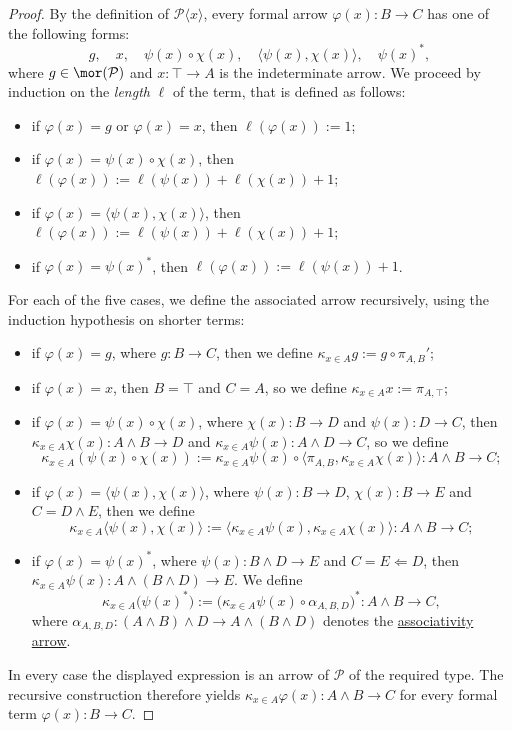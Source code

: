 \begin{proof}
    By the definition of $\mathcal P\langle x\rangle$, every formal arrow $\varphi(x) : B \to C$ has one of the following forms:
    \[ g,\quad x,\quad \psi(x) \circ \chi(x),\quad \langle \psi(x),\chi(x)\rangle,\quad \psi(x)^*, \]
    where $g \in \mor(\mathcal P)$ and $x : \top \to A$ is the indeterminate arrow. We proceed by induction on the \textit{length} $\ell$ of the term, that is defined as follows:
    \begin{itemize}
        \item if $\varphi(x) = g$ or $\varphi(x) = x$, then $\ell(\varphi(x)) := 1$;
        \item if $\varphi(x) = \psi(x) \circ \chi(x)$, then $\ell(\varphi(x)) := \ell(\psi(x)) + \ell(\chi(x)) + 1$;
        \item if $\varphi(x) = \langle \psi(x), \chi(x)\rangle$, then $\ell(\varphi(x)) := \ell(\psi(x)) + \ell(\chi(x)) + 1$;
        \item if $\varphi(x) = \psi(x)^*$, then $\ell(\varphi(x)) := \ell(\psi(x)) + 1$.
    \end{itemize} 
    For each of the five cases, we define the associated arrow recursively, using the induction hypothesis on shorter terms:
    \begin{itemize}
        \item if $\varphi(x) = g$, where $g : B \to C$, then we define $\kappa_{x \in A}g := g \circ \pi_{A,B}'$;
        \item if $\varphi(x) = x$, then $B = \top$ and $C = A$, so we define $\kappa_{x \in A}x := \pi_{A,\top}$;
        \item if $\varphi(x) = \psi(x) \circ \chi(x)$, where $\chi(x) : B \to D$ and $\psi(x) : D \to C$, then $\kappa_{x \in A}\chi(x) : A \land B \to D$ and $\kappa_{x \in A}\psi(x) : A \land D \to C$, so we define
        \[ \kappa_{x \in A} (\psi(x) \circ \chi(x)) := \kappa_{x \in A} \psi(x) \circ \langle \pi_{A,B}, \kappa_{x \in A} \chi(x)\rangle : A \land B \to C; \]
        \item if $\varphi(x) = \langle \psi(x), \chi(x)\rangle$, where $\psi(x) : B \to D$, $\chi(x) : B \to E$ and $C = D \land E$, then we define
        \[ \kappa_{x \in A} \langle \psi(x), \chi(x)\rangle := \langle \kappa_{x \in A} \psi(x), \kappa_{x \in A} \chi(x)\rangle : A \land B \to C; \]
        \item if $\varphi(x) = \psi(x)^*$, where $\psi(x) : B \land D \to E$ and $C = E \Leftarrow D$, then $\kappa_{x \in A}\psi(x) : A \land (B \land D) \to E$. We define
        \[ \kappa_{x \in A}\big(\psi(x)^*\big) := \big(\kappa_{x \in A}\psi(x) \circ \alpha_{A,B,D}\big)^* : A \land B \to C, \]
        where $\alpha_{A,B,D} : (A \land B) \land D \to A \land (B \land D)$ denotes the \hyperref[ex:associativity-of-conjunction]{associativity arrow}.
    \end{itemize}
    In every case the displayed expression is an arrow of $\mathcal P$ of the required type. The recursive construction therefore yields
    $\kappa_{x \in A}\varphi(x) : A \land B \to C$ for every formal term $\varphi(x) : B \to C$.
\end{proof}

